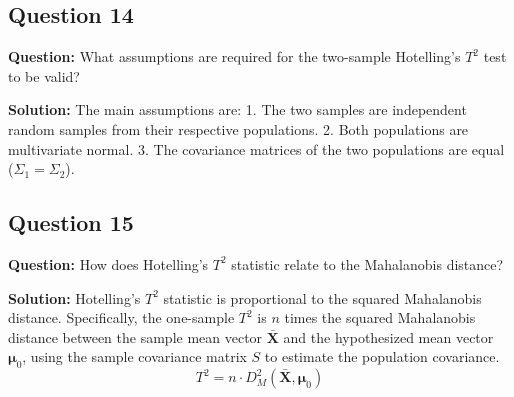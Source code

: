 \subsection*{Question 14}
\textbf{Question:} What assumptions are required for the two-sample Hotelling's $T^2$ test to be valid?

\textbf{Solution:}
The main assumptions are:
1.  The two samples are independent random samples from their respective populations.
2.  Both populations are multivariate normal.
3.  The covariance matrices of the two populations are equal ($\Sigma_1 = \Sigma_2$).

\subsection*{Question 15}
\textbf{Question:} How does Hotelling's $T^2$ statistic relate to the Mahalanobis distance?

\textbf{Solution:}
Hotelling's $T^2$ statistic is proportional to the squared Mahalanobis distance. Specifically, the one-sample $T^2$ is $n$ times the squared Mahalanobis distance between the sample mean vector $\bar{\mathbf{X}}$ and the hypothesized mean vector $\boldsymbol{\mu}_0$, using the sample covariance matrix $S$ to estimate the population covariance.
$$ T^2 = n \cdot D_M^2(\bar{\mathbf{X}}, \boldsymbol{\mu}_0) $$

